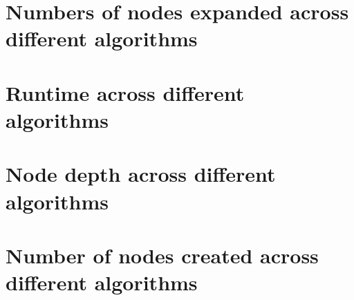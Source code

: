 \documentclass[letterpaper,12pt]{article}
\begin{document}
\begin{appendices}
\newpage
\section{Numbers of nodes expanded across different algorithms}
\label{sec:appendix-nodes-expanded}


\section{Runtime across different algorithms}
\label{sec:appendix-runtime}


\newpage
\section{Node depth across different algorithms}
\label{sec:appendix-node-depth}


\section{Number of nodes created across different algorithms}
\label{sec:appendix-nodes-created}


\newpage



\end{appendices}
\end{document}
